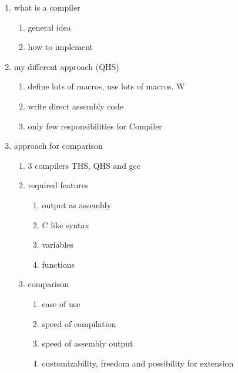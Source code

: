 \documentclass[parskip=full]{scrreprt}
\title{\thetitle}
\author{Fabio Stalder\vspace{1cm}\\
Betreut durch \\
Thomas Jampen}
\begin{document}
\maketitle

\tableofcontents


\iffalse
    \begin{enumerate}
        \item what is a compiler
              \begin{enumerate}
                  \item general idea
                  \item how to implement
              \end{enumerate}
        \item my different approach (QHS)
              \begin{enumerate}
                  \item define lots of macros, use lots of macros. W
                  \item write direct assembly code
                  \item only few responsibilities for Compiler
              \end{enumerate}
        \item approach for comparison
              \begin{enumerate}
                  \item 3 compilers THS, QHS and gcc
                  \item required features
                        \begin{enumerate}
                            \item output as assembly
                            \item C like syntax
                            \item variables
                            \item functions
                        \end{enumerate}
                  \item comparison
                        \begin{enumerate}
                            \item ease of use
                            \item speed of compilation
                            \item speed of assembly output
                            \item customizability, freedom and possibility for extension

\end{enumerate}
\end{enumerate}
\end{enumerate}
\end{document}
